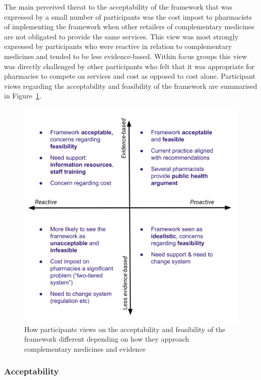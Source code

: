\documentclass[11pt,a4paper]{article}
\begin{document}
The main perceived threat to the acceptability of the framework that was
expressed by a small number of participants was the cost impost to
pharmacists of implementing the framework when other retailers of
complementary medicines are not obligated to provide the same services.
This view was most strongly expressed by participants who were reactive
in relation to complementary medicines and tended to be less
evidence-based. Within focus groups this view was directly challenged by
other participants who felt that it was appropriate for pharmacies to
compete on services and cost as opposed to cost alone. Participant views
regarding the acceptability and feasibility of the framework are
summarised in Figure~\ref{accfeas}.

\begin{figure}
\centering
\includegraphics{files/CMEthics_accfeas.png}
\caption{How participants views on the acceptability and feasibility of
the framework different depending on how they approach complementary
medicines and evidence \label{accfeas}}
\end{figure}

\subsubsection{Acceptability}\label{acceptability}
\end{document}
